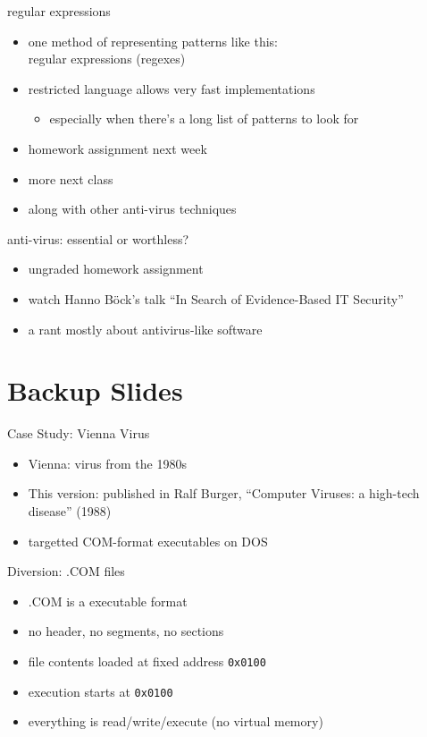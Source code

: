 \begin{frame}{regular expressions}
    \begin{itemize}
    \item one method of representing patterns like this: \\
          regular expressions (regexes)
    \item restricted language allows very fast implementations
        \begin{itemize}
        \item especially when there's a long list of patterns to look for
        \end{itemize}
    \item homework assignment next week
    \item more next class
    \item along with other anti-virus techniques
    \end{itemize}
\end{frame}

\begin{frame}{anti-virus: essential or worthless?}
    \begin{itemize}
    \item ungraded homework assignment
    \item watch Hanno B\"ock's talk ``In Search of Evidence-Based IT Security''
    \item a rant mostly about antivirus-like software
    \end{itemize}
\end{frame}


\section{Backup Slides}

\begin{frame}{Case Study: Vienna Virus}
\begin{itemize}
    \item Vienna: virus from the 1980s
    \item This version: published in Ralf Burger, ``Computer Viruses: a high-tech disease'' (1988)
    \item targetted COM-format executables on DOS
\end{itemize}
\end{frame}

\begin{frame}{Diversion: .COM files}
    \begin{itemize}
    \item .COM is a  executable format
    \item no header, no segments, no sections
    \item file contents loaded at fixed address {\tt 0x0100}
    \item execution starts at {\tt 0x0100}
    \item everything is read/write/execute (no virtual memory)
    \end{itemize}
\end{frame}


